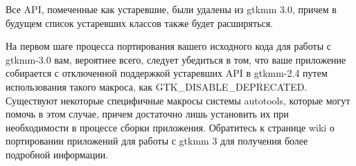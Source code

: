 Все API, помеченные как устаревшие, были удалены из gtkmm 3.0, причем в будущем список устаревших классов также будет расширяться.

На первом шаге процесса портирования вашего исходного кода для работы с gtkmm-3.0 вам, вероятнее всего, следует убедиться в том, что ваше приложение собирается с отключенной поддержкой устаревших API в gtkmm-2.4 путем использования такого макроса, как GTK\_DISABLE\_DEPRECATED. Существуют некоторые специфичные макросы системы autotools, которые могут помочь в этом случае, причем достаточно лишь установить их при необходимости в процессе сборки приложения. Обратитесь к странице wiki о портировании приложений для работы с gtkmm 3 для получения более подробной информации. 